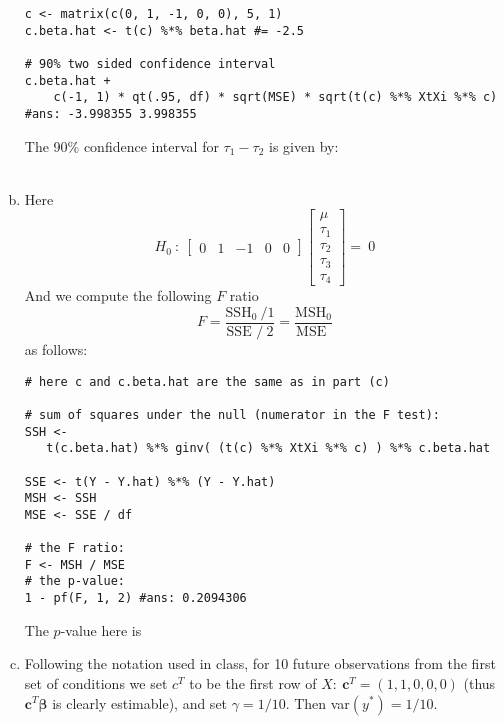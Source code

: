 \documentclass[paper=a4, fontsize=11pt]{scrartcl} %
\newcommand{\vecBeta}{\mathbf{\beta}}
\newcommand{\vecC}{\mathbf{c}}
\begin{document}
\begin{enumerate}[(a)]
 \begin{lstlisting}[basicstyle=\ttfamily\small\bfseries]
c <- matrix(c(0, 1, -1, 0, 0), 5, 1)
c.beta.hat <- t(c) %*% beta.hat #= -2.5

# 90% two sided confidence interval
c.beta.hat +
    c(-1, 1) * qt(.95, df) * sqrt(MSE) * sqrt(t(c) %*% XtXi %*% c)
#ans: -3.998355 3.998355
\end{lstlisting}

 The 90\% confidence interval for $\tau_1 - \tau_2$ is given by:
\\
 \\
 
 
 
\item Here
$$
H_0 \ : \ 
\begin{bmatrix} 0 & 1 & -1 & 0 & 0 
\end{bmatrix}
\begin{bmatrix} \mu\\
                             \tau_1\\
                             \tau_2\\
                             \tau_3\\
                             \tau_4
\end{bmatrix}
= \ 0
$$ 
And we compute the following $F$ ratio
$$
F = \frac{\text{SSH}_0 \ / 1 }{ \text{SSE }  / \ 2 } = \frac{\text{MSH}_0 }{ \text{MSE } } 
$$
as follows:
 \begin{lstlisting}[basicstyle=\ttfamily\small\bfseries]
# here c and c.beta.hat are the same as in part (c)

# sum of squares under the null (numerator in the F test):
SSH <- 
   t(c.beta.hat) %*% ginv( (t(c) %*% XtXi %*% c) ) %*% c.beta.hat

SSE <- t(Y - Y.hat) %*% (Y - Y.hat)
MSH <- SSH
MSE <- SSE / df

# the F ratio:
F <- MSH / MSE
# the p-value:
1 - pf(F, 1, 2) #ans: 0.2094306
\end{lstlisting}

The $p$-value here is \ \\


\item Following the notation used in class, for 10 future observations from the first set of conditions 
we set $c^T$ to be the first row of $X: \ \vecC^T = (1, 1, 0, 0, 0)$ (thus $\vecC^T \vecBeta$ is 
clearly estimable), and set $\gamma = 1/10$.  Then var$(y^*) = 1/10$. \\


\end{enumerate}
\end{document}

